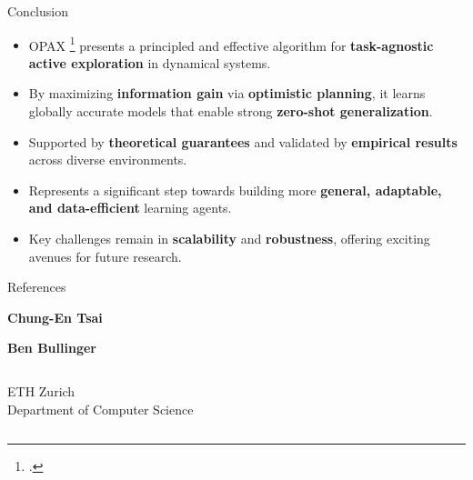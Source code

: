 \documentclass[11pt,aspectratio=169,handout]{beamer} %
\begin{document}
\begin{frame}{Conclusion}
    \begin{itemize}
        \item OPAX \footcite{sukhija2023optimistic} presents a principled and effective algorithm for \textbf{task-agnostic active exploration} in dynamical systems.
        \pause
        \item By maximizing \textbf{information gain} via \textbf{optimistic planning}, it learns globally accurate models that enable strong \textbf{zero-shot generalization}.
        \pause
        \item Supported by \textbf{theoretical guarantees} and validated by \textbf{empirical results} across diverse environments.
        \pause
        \item Represents a significant step towards building more \textbf{general, adaptable, and data-efficient} learning agents.
        \pause
        \item Key challenges remain in \textbf{scalability} and \textbf{robustness}, offering exciting avenues for future research.
    \end{itemize}
\end{frame}

\begin{frame}[allowframebreaks]{References} %
    \printbibliography
\end{frame}

\begin{closingframe}

    \begin{center}
        \begin{minipage}{1\textwidth}
            \textbf{Chung-En Tsai}\hfill
            \textit{}
            
            \vspace{0.25em}
            
            \textbf{Ben Bullinger}\hfill\textit{}
        \end{minipage}
    \end{center}

    \vfill

    \begin{columns}
		\begin{column}{\textwidth}
            ETH Zurich\\
            Department of Computer Science
		\end{column}
	\end{columns}

\end{closingframe}
\end{document}
